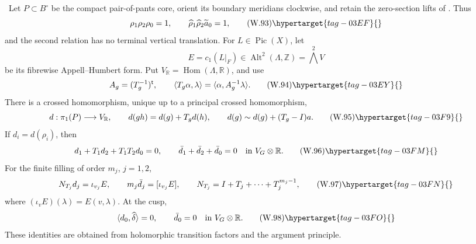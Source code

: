 
\begin{proposition}
\hypertarget{tag-03IH}{}\label{wbII:prop:analytic-ah-boundary}


\ Let \(P\subset B^\circ\) be the compact pair-of-pants core,
orient its boundary meridians clockwise, and retain the zero-section lifts
of .  Thus
\[
 \rho_1\rho_2\rho_0=1,
 \qquad
 \widehat\rho_1\widehat\rho_2\widetilde a_0=1,
\tag{W.93}\hypertarget{tag-03EF}{}\label{wbII:eq:W:5.17-A1}
\]
and the second relation has no terminal vertical translation.  For
\(L\in\operatorname{Pic}(X)\), let
\[
 E=c_1(L|_F)\in\operatorname{Alt}^2(\Lambda,\mathbb Z)
   =\bigwedge^2V
\]
be its fibrewise Appell--Humbert form.  Put
\(V_{\mathbb R}=\operatorname{Hom}(\Lambda,\mathbb R)\), and use
\[
 A_g=(T_g^{-1})^{\mathsf t},
 \qquad
 \langle T_g\alpha,\lambda\rangle
 =\langle\alpha,A_g^{-1}\lambda\rangle.
\tag{W.94}\hypertarget{tag-03EY}{}\label{wbII:eq:W:5.17-A2}
\]
There is a crossed homomorphism, unique up to a principal crossed
homomorphism,
\[
 d:\pi_1(P)\longrightarrow V_{\mathbb R},
 \qquad
 d(gh)=d(g)+T_gd(h),
 \qquad
 d(g)\sim d(g)+(T_g-I)a.
\tag{W.95}\hypertarget{tag-03F9}{}\label{wbII:eq:W:5.17-A3}
\]
If \(d_i=d(\rho_i)\), then
\[
 d_1+T_1d_2+T_1T_2d_0=0,
 \qquad
 \bar d_1+\bar d_2+\bar d_0=0
 \quad\text{in }V_G\otimes\mathbb R.
\tag{W.96}\hypertarget{tag-03FM}{}\label{wbII:eq:W:5.17-A4}
\]
For the finite filling of order \(m_j\), \(j=1,2\),
\[
 N_{T_j}d_j=\iota_{v_j}E,
 \qquad
 m_j\bar d_j=[\iota_{v_j}E],
 \qquad
 N_{T_j}=I+T_j+\cdots+T_j^{m_j-1},
\tag{W.97}\hypertarget{tag-03FN}{}\label{wbII:eq:W:5.17-A5}
\]
where \((\iota_vE)(\lambda)=E(v,\lambda)\).  At the cusp,
\[
 \langle d_0,\widehat\delta\rangle=0,
 \qquad
 \bar d_0=0\quad\text{in }V_G\otimes\mathbb R.
\tag{W.98}\hypertarget{tag-03FO}{}\label{wbII:eq:W:5.17-A6}
\]
These identities are obtained from holomorphic transition factors and the
argument principle.
\end{proposition}

